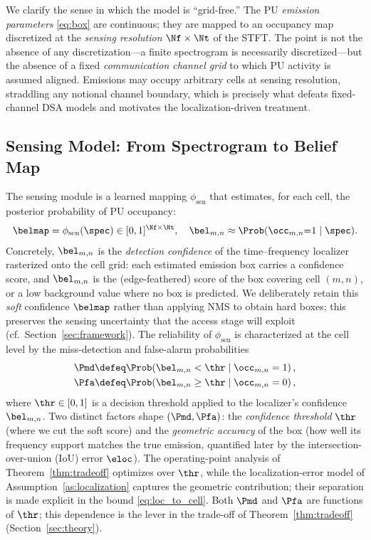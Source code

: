 We clarify the sense in which the model is ``grid-free.'' The PU
\emph{emission parameters} \eqref{eq:box} are continuous; they are mapped to
an occupancy map discretized at the \emph{sensing resolution} $\Nf\times\Nt$
of the STFT. The point is not the absence of any discretization---a finite
spectrogram is necessarily discretized---but the absence of a fixed
\emph{communication channel grid} to which PU activity is assumed aligned.
Emissions may occupy arbitrary cells at sensing resolution, straddling any
notional channel boundary, which is precisely what defeats fixed-channel DSA
models and motivates the localization-driven treatment.

\subsection{Sensing Model: From Spectrogram to Belief Map}
\label{subsec:sensing}
The sensing module is a learned mapping $\phi_{\mathrm{sen}}$ that estimates,
for each cell, the posterior probability of PU occupancy:
\begin{equation}
\belmap = \phi_{\mathrm{sen}}(\spec) \in [0,1]^{\Nf\times\Nt},
\quad
\bel_{m,n} \approx \Prob(\occ_{m,n}{=}1 \mid \spec).
\label{eq:belief}
\end{equation}
Concretely, $\bel_{m,n}$ is the \emph{detection confidence} of the
time--frequency localizer rasterized onto the cell grid: each estimated
emission box carries a confidence score, and $\bel_{m,n}$ is the (edge-feathered)
score of the box covering cell $(m,n)$, or a low background value where no box
is predicted. We deliberately retain this \emph{soft} confidence $\belmap$
rather than applying NMS to obtain hard boxes; this
preserves the sensing uncertainty that the access stage will exploit
(cf.\ Section~\ref{sec:framework}). The reliability of $\phi_{\mathrm{sen}}$
is characterized at the cell level by the miss-detection and false-alarm
probabilities
\begin{align}
\Pmd &\defeq \Prob\!\left(\bel_{m,n} < \thr \;\middle|\; \occ_{m,n}=1\right),
\label{eq:pmd}\\
\Pfa &\defeq \Prob\!\left(\bel_{m,n} \ge \thr \;\middle|\; \occ_{m,n}=0\right),
\label{eq:pfa}
\end{align}
where $\thr\in[0,1]$ is a decision threshold applied to the localizer's
confidence $\bel_{m,n}$. Two distinct factors shape $(\Pmd,\Pfa)$: the
\emph{confidence threshold} $\thr$ (where we cut the soft score) and the
\emph{geometric accuracy} of the box (how well its frequency support matches
the true emission, quantified later by the intersection-over-union (IoU)
error $\eloc$). The
operating-point analysis of Theorem~\ref{thm:tradeoff} optimizes over $\thr$,
while the localization-error model of Assumption~\ref{as:localization}
captures the geometric contribution; their separation is made explicit in the
bound \eqref{eq:loc_to_cell}. Both $\Pmd$ and $\Pfa$ are functions of $\thr$;
this dependence is the lever in the trade-off of
Theorem~\ref{thm:tradeoff} (Section~\ref{sec:theory}).

